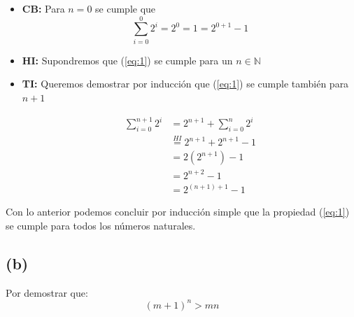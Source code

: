 \documentclass[12pt]{article}
\newcommand{\N}{\mathbb{N}}
\begin{document}
\begin{itemize}
    \item \textbf{CB:}
    Para $n=0$ se cumple que
        \begin{equation*}
            \sum_{i=0}^{0} 2^i = 2^0 = 1 = 2^{0+1} - 1
        \end{equation*}

    \item \textbf{HI:}
    Supondremos que (\ref*{eq:1}) se cumple para un $n \in \N$

    \item \textbf{TI:}
    Queremos demostrar por inducción que (\ref*{eq:1}) se cumple también para $n + 1$

    \begin{align*}
        \sum_{i=0}^{n+1} 2^i
        &= 2^{n+1} + \sum_{i=0}^{n} 2^i \\
        &\stackrel{HI}{=} 2^{n+1} + 2^{n+1} - 1 \\
        &= 2(2^{n+1}) - 1 \\
        &= 2^{n+2} - 1 \\
        &= 2^{(n+1)+1} - 1
    \end{align*}
\end{itemize}

Con lo anterior podemos concluir por inducción simple que la propiedad (\ref*{eq:1}) se cumple para todos los números naturales.



\newpage
\subsection*{(b)}
Por demostrar que:
\begin{equation}
    \label{eq:2}
    (m + 1)^n > mn
\end{equation}
\end{document}
